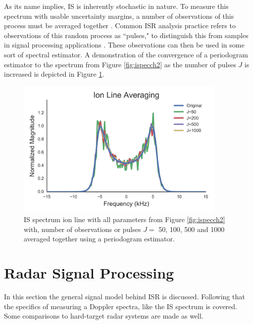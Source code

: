 
As its name implies, IS is inherently stochastic in nature. To measure this spectrum with usable uncertainty margins, a number of observations of this process must be averaged together \citep{Diaz:2008co}. Common ISR analysis practice refers to observations of this random process as ``pulses," to distinguish this from samples in signal processing applications \citep{dtsp:openhiem}. These observations can then be used in some sort of spectral estimator. A demonstration of the convergence of a periodogram estimator to the spectrum from Figure \ref{fig:ispecch2} as the number of pulses $J$ is increased is depicted in Figure \ref{fig:ispecch2ave}.
\begin{figure}[htb]
\centering
\includegraphics[width=4in]{Specionave}
\caption{IS spectrum ion line with all parameters from Figure \ref{fig:ispecch2} with, number of observations or pulses $J =$ 50, 100, 500 and 1000 averaged together using a periodogram estimator. }
\label{fig:ispecch2ave}
\end{figure}

\section{Radar Signal Processing}

In this section the general signal model behind ISR is discussed. Following that the specifics of measuring a Doppler spectra, like the IS spectrum is covered. Some comparisons to hard-target radar systems are made as well.

